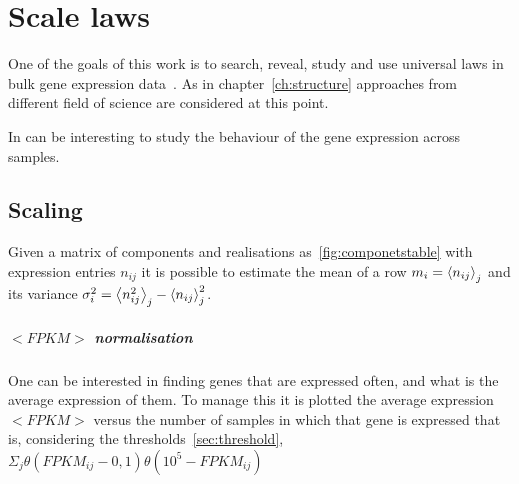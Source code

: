 \chapter{Scale laws}\label{ch:scalelaws}
One of the goals of this work is to search, reveal, study and use universal laws in bulk gene expression data~\nocite{altmann2016statistical}.
As in chapter~\ref{ch:structure} approaches from different field of science are considered at this point.

In can be interesting to study the behaviour of the gene expression across samples.

\section{Scaling}

Given a matrix of components and realisations as~\ref{fig:componetstable} with expression entries $n_{i j}$ it is possible to estimate the mean of a row $m_i=\left\langle n_{i j}\right\rangle_j$ and its variance $\sigma^2_{i}=\left\langle n_{i j}^2\right\rangle_j - \left\langle n_{i j}\right\rangle^2_j$.



\paragraph{$<FPKM>$ normalisation}
One can be interested in finding genes that are expressed often, and what is the 
average expression of them.
To manage this it is plotted the average expression $<FPKM>$ versus the number 
of samples in which that gene is expressed that is, considering the thresholds~\ref{sec:threshold}, 
$\Sigma_j\theta (FPKM_{ij}-0,1)\theta (10^5-FPKM_{ij})$

